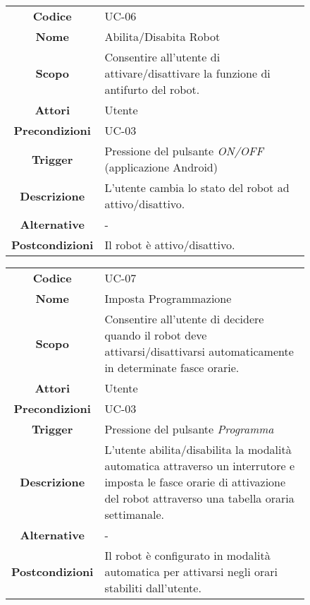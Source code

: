 \documentclass[]{article}
\begin{document}
\begin{figure}[htbp]
\centering
\begin{tabular}{|c|l|}
\hline

\textbf{Codice}
 & 
UC-06
\\

\textbf{Nome}
 & 
Abilita/Disabita Robot
\\

\textbf{Scopo}
 & 
Consentire all'utente di attivare/disattivare la funzione di antifurto
del robot.
\\

\textbf{Attori}
 & 
Utente
\\

\textbf{Precondizioni}
 & 
UC-03
\\

\textbf{Trigger}
 & 
Pressione del pulsante \emph{ON/OFF} (applicazione Android)
\\

\textbf{Descrizione}
 & 
L'utente cambia lo stato del robot ad attivo/disattivo.
\\

\textbf{Alternative}
 & 
-
\\

\textbf{Postcondizioni}
 & 
Il robot è attivo/disattivo.
\\
\hline
\end{tabular}
\end{figure}

\begin{figure}[htbp]
\centering
\begin{tabular}{|c|l|}
\hline

\textbf{Codice}
 & 
UC-07
\\

\textbf{Nome}
 & 
Imposta Programmazione
\\

\textbf{Scopo}
 & 
Consentire all'utente di decidere quando il robot deve
attivarsi/disattivarsi automaticamente in determinate fasce
orarie.
\\

\textbf{Attori}
 & 
Utente
\\

\textbf{Precondizioni}
 & 
UC-03
\\

\textbf{Trigger}
 & 
Pressione del pulsante \emph{Programma}
\\

\textbf{Descrizione}
 & 
L'utente abilita/disabilita la modalità automatica attraverso un
interrutore e imposta le fasce orarie di attivazione del robot
attraverso una tabella oraria settimanale.
\\

\textbf{Alternative}
 & 
-
\\

\textbf{Postcondizioni}
 & 
Il robot è configurato in modalità automatica per attivarsi negli orari
stabiliti dall'utente.
\\
\hline
\end{tabular}
\end{figure}
\end{document}
